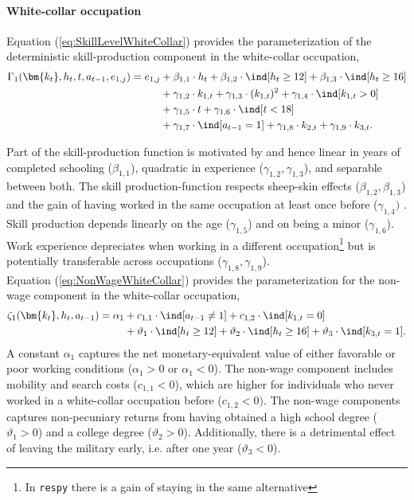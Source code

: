 \paragraph{White-collar occupation} Equation (\ref{eq:SkillLevelWhiteCollar}) provides the parameterization of the deterministic skill-production component in the white-collar occupation,
%
\begin{align}\label{eq:SkillLevelWhiteCollar}
    \Gamma_1(\bm{k_t}, h_t, t, a_{t-1}, e_{1,j}) = e_{1,j} & + \beta_{1,1} \cdot h_t + \beta_{1, 2} \cdot \ind[h_t \geq 12] + \beta_{1,3} \cdot \ind[h_t\geq 16] \nonumber\\
                                 \nonumber & + \gamma_{1, 2} \cdot  k_{1,t} + \gamma_{1,3} \cdot  (k_{1,t})^2 + \gamma_{1,4} \cdot  \ind[k_{1,t} > 0] \\
                                  \nonumber & + \gamma_{1,5} \cdot  t + \gamma_{1,6} \cdot \ind[t < 18] \nonumber\\
                                  & + \gamma_{1,7} \cdot \ind[a_{t-1} = 1] + \gamma_{1,8} \cdot  k_{2,t} + \gamma_{1,9} \cdot  k_{3,t}.
\end{align}
%

Part of the skill-production function is motivated by \citet{Mincer.1958, Mincer.1974} and hence linear in years of completed schooling ($\beta_{1,1}$), quadratic in experience ($\gamma_{1,2}, \gamma_{1,3}$), and separable between both. The skill production-function respects sheep-skin effects ($\beta_{1,2}, \beta_{1,3}$) and the gain of having worked in the same occupation at least once before ($\gamma_{1,4})$ \citep{Spence.1973, Arrow.1973, Hungerford.1987, Jaeger.1996}. Skill production depends linearly on the age ($\gamma_{1,5}$) and on being a minor ($\gamma_{1,6}$). Work experience depreciates when working in a different occupation\footnote{In \texttt{respy} there is a gain of staying in the same alternative} but is potentially transferable across occupations ($\gamma_{1,8}, \gamma_{1,9}$). \\

Equation (\ref{eq:NonWageWhiteCollar}) provides the parameterization for the non-wage component in the white-collar occupation,
%
\begin{align}\label{eq:NonWageWhiteCollar}
\zeta_{1}(\bm{k_t}, h_t, a_{t-1}) = \alpha_1  & + c_{1,1} \cdot \ind[a_{t-1} \neq 1] + c_{1,2} \cdot \ind[k_{1,t} = 0] \nonumber \\
                            & + \vartheta_1 \cdot \ind[h_t \geq 12] + \vartheta_2 \cdot \ind[h_t \geq 16] + \vartheta_3 \cdot \ind[k_{3,t} = 1].
\end{align}
%
A constant $\alpha_1$ captures the net monetary-equivalent value of either favorable or poor working conditions ($\alpha_1 > 0$ or $\alpha_1 < 0$). The non-wage component includes mobility and search costs ($c_{1,1} < 0$), which are higher for individuals who never worked in a white-collar occupation before ($c_{1,2}< 0)$. The non-wage components captures non-pecuniary returns from having obtained a high school degree ($\vartheta_1 >0 $) and a college degree ($\vartheta_2 >0$). Additionally, there is a detrimental effect of leaving the military early, i.e. after one year ($\vartheta_3 < 0$).

